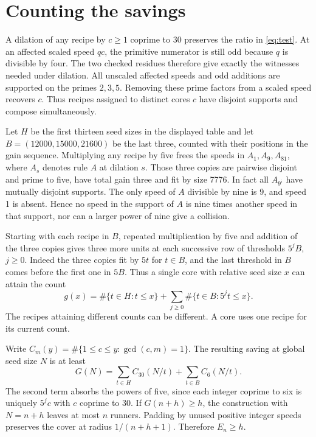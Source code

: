 \documentclass[11pt]{article}
\theoremstyle{definition}
\begin{document}
\section{Counting the savings}\label{sec:count}

A dilation of any recipe by \(c\ge1\) coprime to 30 preserves the
ratio in \eqref{eq:test}. At an affected scaled speed \(qc\), the
primitive numerator is still odd because \(q\) is divisible by four.
The two checked residues therefore give exactly the witnesses needed
under dilation. All unscaled affected speeds and odd additions are
supported on the primes \(2,3,5\). Removing these prime factors from
a scaled speed recovers \(c\). Thus recipes assigned to distinct
cores \(c\) have disjoint supports and compose simultaneously.

Let \(H\) be the first thirteen seed sizes in the displayed table and
let \(B=(12000,15000,21600)\) be the last three, counted with their
positions in the gain sequence. Multiplying any recipe by five frees
the speeds in \(A_1,A_9,A_{81}\), where \(A_s\) denotes rule \(A\)
at dilation \(s\). Those three copies are pairwise disjoint and prime
to five, have total gain three and fit by size 7776. In fact all
\(A_{9^i}\) have mutually disjoint supports. The only speed of \(A\)
divisible by nine is 9, and speed 1 is absent. Hence no speed in the
support of \(A\) is nine times another speed in that support, nor
can a larger power of nine give a collision.

Starting with each recipe in \(B\), repeated multiplication by five
and addition of the three copies gives three more units at each
successive row of thresholds \(5^j B\), \(j\ge0\).
Indeed the three copies fit by \(5t\) for \(t\in B\), and the last
threshold in \(B\) comes before the first one in \(5B\). Thus a
single core with relative seed size \(x\) can attain the count
\[
    g(x)=\#\{t\in H:t\le x\}
       +\sum_{j\ge0}\#\{t\in B:5^j t\le x\}.
\]
The recipes attaining different counts can be different. A core uses
one recipe for its current count.

Write \(C_m(y)=\#\{1\le c\le y:\gcd(c,m)=1\}\).
The resulting saving at global seed size \(N\) is at least
\[
 G(N)=\sum_{t\in H}C_{30}(N/t)+\sum_{t\in B}C_6(N/t).
 \tag{2}\label{eq:count}
\]
The second term absorbs the powers of five, since each integer
coprime to six is uniquely \(5^j c\) with \(c\) coprime to 30.
If \(G(n+h)\ge h\), the construction with \(N=n+h\) leaves
at most \(n\) runners. Padding by unused positive integer speeds
preserves the cover at radius \(1/(n+h+1)\). Therefore \(E_n\ge h\).
\end{document}
